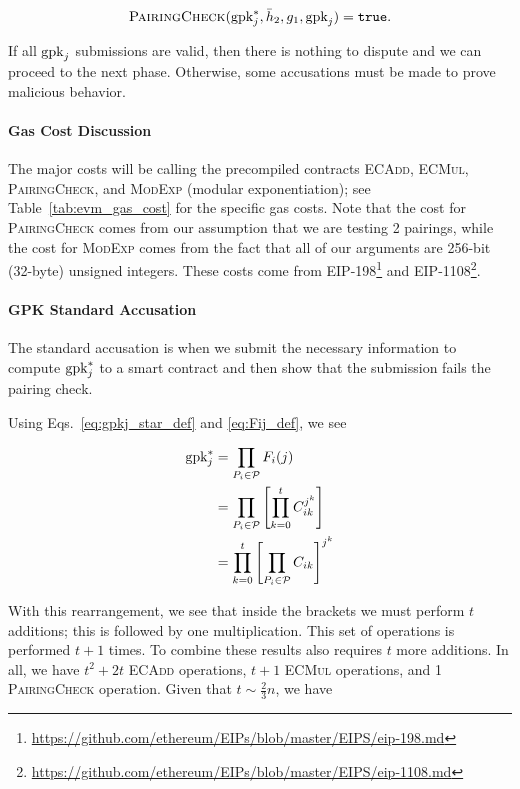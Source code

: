 \begin{equation}
    \textsc{PairingCheck}(\textrm{gpk}_{j}^{*}, \bar{h}_{2}, g_{1}, \textrm{gpk}_{j})
        = \texttt{true}.
\end{equation}

\noindent
If all $\textrm{gpk}_{j}$ submissions are valid,
then there is nothing to dispute and we can proceed to the next phase.
Otherwise, some accusations must be made to prove malicious behavior.

\paragraph{Gas Cost Discussion}
The major costs will be calling the precompiled contracts
\textsc{ECAdd}, \textsc{ECMul}, \textsc{PairingCheck},
and \textsc{ModExp} (modular exponentiation);
see Table~\ref{tab:evm_gas_cost} for the specific gas costs.
Note that the cost for \textsc{PairingCheck} comes
from our assumption that we are testing 2 pairings,
while the cost for \textsc{ModExp} comes from the fact
that all of our arguments are 256-bit (32-byte) unsigned integers.
These costs come from EIP-198\footnote{
    \url{https://github.com/ethereum/EIPs/blob/master/EIPS/eip-198.md}}
and EIP-1108\footnote{
    \url{https://github.com/ethereum/EIPs/blob/master/EIPS/eip-1108.md}}.






\paragraph{GPK Standard Accusation}
The standard accusation is when we submit the necessary information
to compute $\textrm{gpk}_{j}^{*}$ to a smart contract and then show
that the submission fails the pairing check.

Using Eqs.~\eqref{eq:gpkj_star_def} and \eqref{eq:Fij_def},
we see

\begin{align}
    \textrm{gpk}_{j}^{*} &= \prod_{P_{i}\in\mathcal{P}}F_{i}(j)
            \nonumber\\
        &= \prod_{P_{i}\in\mathcal{P}} \left[ \prod_{k=0}^{t} C_{ik}^{j^{k}} \right]
            \nonumber\\
        &= \prod_{k=0}^{t}
            \left[ \prod_{P_{i}\in\mathcal{P}} C_{ik} \right]^{j^{k}}
    \label{eq:gpkj_rearrange}
\end{align}

\noindent
With this rearrangement, we see that inside the brackets we must perform
$t$ additions; this is followed by one multiplication.
This set of operations is performed $t+1$ times.
To combine these results also requires $t$ more additions.
In all, we have $t^{2} + 2t$ \textsc{ECAdd} operations,
$t+1$ \textsc{ECMul} operations,
and 1 \textsc{PairingCheck} operation.
Given that $t \sim \frac{2}{3}n$, we have

